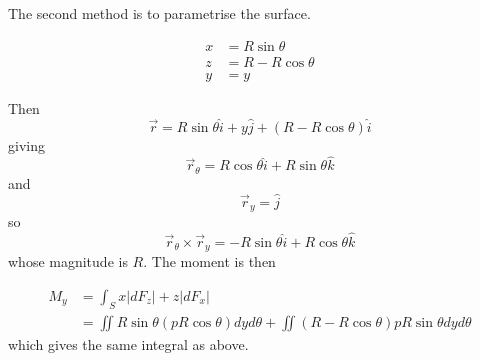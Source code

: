 \documentclass[12pt]{article}
\begin{document}
The second method is to parametrise the surface.

\begin{ex}
\begin{align*}
	x &= R\sin\theta \\
	z &= R - R\cos\theta \\
	y &= y
\end{align*}

Then
$$\vec{r} = R\sin\theta\hat{i} + y\hat{j} + (R-R\cos\theta)\hat{i}$$
giving
$$\vec{r}_\theta = R\cos\theta\hat{i} + R\sin\theta\hat{k}$$
and
$$\vec{r}_y = \hat{j}$$
so
$$\vec{r}_\theta\times\vec{r}_y = -R\sin\theta\hat{i} + R\cos\theta\hat{k}$$
whose magnitude is $R$. The moment is then

\begin{align*}
	M_y &= \int_S x|dF_z| + z|dF_x| \\
	    &= \iint R\sin\theta(pR\cos\theta)dyd\theta + \iint(R-R\cos\theta)pR\sin\theta dyd\theta
\end{align*}
which gives the same integral as above.
\end{ex}
\end{document}
